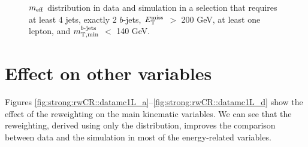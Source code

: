 \begin{figure}[htbp]
\centering
{}
\caption{$m_{\mathrm{eff}}$ distribution in data and simulation in a selection that requires at least 4 jets, exactly 2 $b$-jets, $E_{\rm T}^{\mathrm{miss}}$ $>$ 200 GeV,
at least one lepton, and $m_{\mathrm{T, min}}^{b\textrm{-jets}}$ $<$ 140 GeV.}
\label{fig:meff_in2b_no_corr}
\end{figure}



\section{Effect on other variables}

Figures \ref{fig:strong:rwCR::datamc1L_a}--\ref{fig:strong:rwCR::datamc1L_d}
show the effect of the reweighting on the main kinematic variables.
We can see that the reweighting, derived using only the \meff distribution, improves the 
comparison between data and the simulation 
in most of the energy-related variables.

